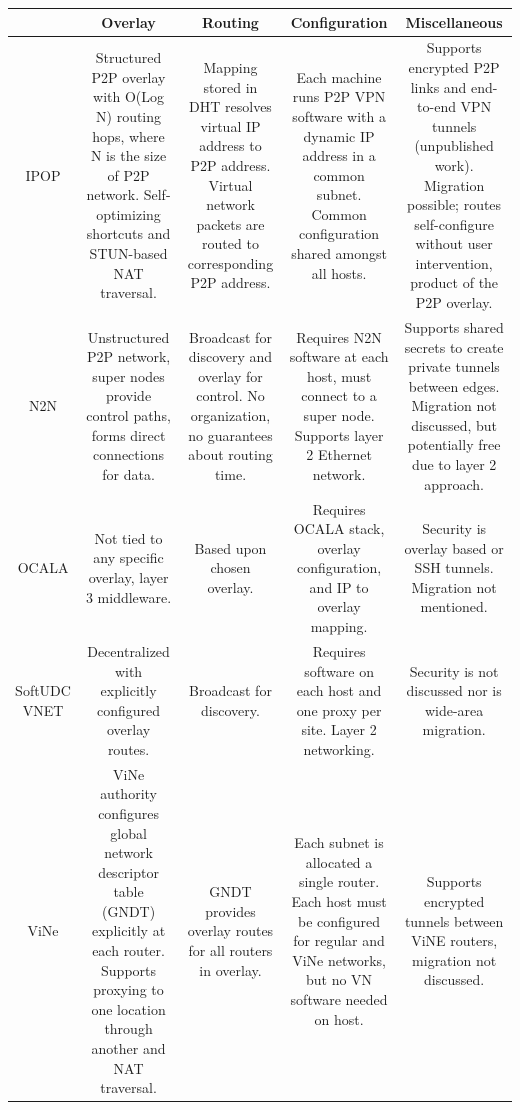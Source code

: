\begin{table}[ht]
\centering
\begin{tabular*}{0.75\textwidth}{|c||c|c|c|c|} \hline
& Overlay & Routing & Configuration & Miscellaneous \\ \hline\hline
IPOP
&
Structured P2P overlay with O(Log N) routing hops, where N is the size of P2P
network. Self-optimizing shortcuts and STUN-based NAT traversal.
&
Mapping stored in DHT resolves virtual IP address to P2P address. Virtual
network packets are routed to corresponding P2P address.
&
Each machine runs P2P VPN software with a dynamic IP address in a common subnet.
Common configuration shared amongst all hosts.
&
Supports encrypted P2P links and end-to-end VPN tunnels (unpublished work).
Migration possible; routes self-configure without user intervention, product of
the P2P overlay.
\\ \hline
N2N
&
Unstructured P2P network, super nodes provide control paths, forms direct
connections for data.
&
Broadcast for discovery and overlay for control.  No organization, no guarantees
about routing time.
&
Requires N2N software at each host, must connect to a super node.  Supports
layer 2 Ethernet network.
&
Supports shared secrets to create private tunnels between edges.  Migration not
discussed, but potentially free due to layer 2 approach.
\\ \hline
OCALA
&
Not tied to any specific overlay, layer 3 middleware.
&
Based upon chosen overlay.
&
Requires OCALA stack, overlay configuration, and IP to overlay mapping.
&
Security is overlay based or SSH tunnels.  Migration not mentioned.
\\ \hline
SoftUDC VNET
&
Decentralized with explicitly configured overlay routes.
&
Broadcast for discovery.
&
Requires software on each host and one proxy per site.  Layer 2 networking.
&
Security is not discussed nor is wide-area migration.
\\ \hline
ViNe
&
ViNe authority configures global network descriptor table (GNDT) explicitly at
each router. Supports proxying to one location through another and NAT traversal.
&
GNDT provides overlay routes for all routers in overlay.
&
Each subnet is allocated a single router.  Each host must be configured for
regular and ViNe networks, but no VN software needed on host.
&
Supports encrypted tunnels between ViNE routers, migration not discussed.

\end{tabular*}
\end{table}
